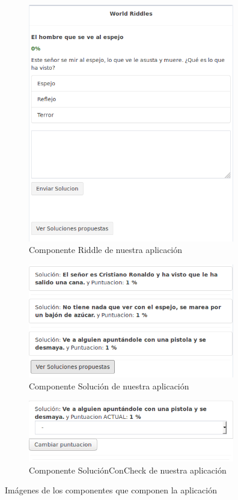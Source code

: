 \begin{figure}[hbtp] \centering
\begin{subfigure}{.6\textwidth}
     \centerline{\includegraphics[width=9cm]{figuras/riddle.png}}
    \caption{Componente Riddle de nuestra aplicación} 
    \label{fig::riddle}
\end{subfigure}
\begin{subfigure}{.6\textwidth}
     \centerline{\includegraphics[width=9cm]{figuras/solucion.png}}
    \caption{Componente Solución de nuestra aplicación} 
    \label{fig::solucion}
\end{subfigure}

\begin{subfigure}{.6\textwidth}
     \centerline{\includegraphics[width=9cm]{figuras/solucionconcheck.png}}
    \caption{Componente SoluciónConCheck de nuestra aplicación} 
    \label{fig::solucionconcheck}
\end{subfigure}
\caption{Imágenes de los componentes que componen la aplicación}
\label{fig::componentes2}
\end{figure}



